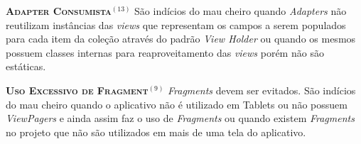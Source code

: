 
  \noindent
  \textsc{\textbf{{\small Adapter Consumista}}}$^{(13)}$ São indícios do mau cheiro quando \textit{Adapters} não reutilizam instâncias das \textit{views} que representam os campos a serem populados para cada item da coleção através do padrão \textit{View Holder} ou quando os mesmos possuem classes internas para reaproveitamento das \textit{views} porém não são estáticas.






  \noindent
  \textsc{\textbf{{\small Uso Excessivo de Fragment}}}$^{(9)}$ \textit{Fragments} devem ser evitados. São indícios do mau cheiro quando o aplicativo não é utilizado em Tablets ou não possuem \textit{ViewPagers} e ainda assim faz o uso de \textit{Fragments} ou quando existem \textit{Fragments} no projeto que não são utilizados em mais de uma tela do aplicativo.

